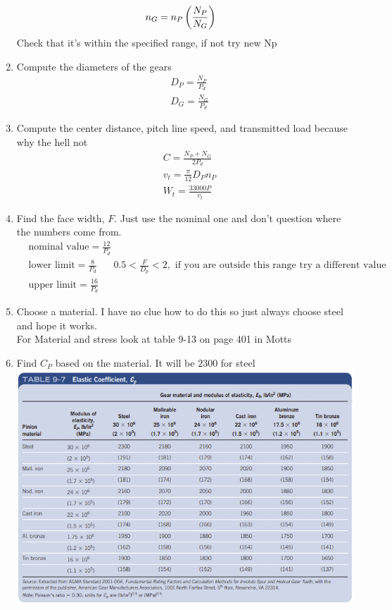 \documentclass[11pt, fleqn]{article}
\begin{document}
\begin{enumerate}
    \begin{align*}
        &n_G=n_P\left( \frac{N_P}{N_G} \right)
    \end{align*}
    Check that it's within the specified range, if not try new Np
    \item Compute the diameters of the gears
    \begin{align*}
        &D_P=\frac{N_P}{P_d}\\
        &D_G=\frac{N_G}{P_d}
    \end{align*}
    \item Compute the center distance, pitch line speed, and transmitted load because why the hell not
    \begin{align*}
        &C=\frac{N_P+N_G}{2P_d}\\
        &v_t=\frac{\pi}{12}D_Pn_P\\
        &W_t=\frac{33000P}{v_t}
    \end{align*}
    \item Find the face width, $F$. Just use the nominal one and don't question where the numbers come from.
    \begin{align*}
        &\text{nominal value}=\frac{12}{P_d}\\
        &\text{lower limit}=\frac{8}{P_d} &0.5<\frac{F}{D_p}<2, \text{ if you are outside this range try a different value}\\
        &\text{upper limit}=\frac{16}{P_d}
    \end{align*}
    \item Choose a material. I have no clue how to do this so just always choose steel and hope it works.\\
    For Material and stress look at table 9-13 on page 401 in Motts\\
    \item Find $C_P$ based on the material. It will be $2300$ for steel\\
    \includegraphics[scale=1]{Gears/9-7.png}

\end{enumerate}
\end{document}
